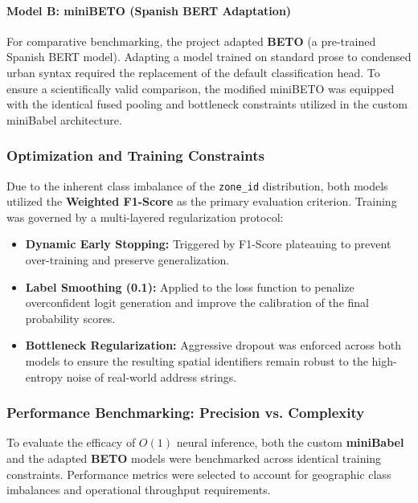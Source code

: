 \paragraph{Model B: miniBETO (Spanish BERT Adaptation)}
For comparative benchmarking, the project adapted \textbf{BETO} (a pre-trained Spanish BERT model). Adapting a model trained on standard prose to condensed urban syntax required the replacement of the default classification head. To ensure a scientifically valid comparison, the modified miniBETO was equipped with the identical fused pooling and bottleneck constraints utilized in the custom miniBabel architecture.

\subsubsection{Optimization and Training Constraints}
Due to the inherent class imbalance of the \texttt{zone\_id} distribution, both models utilized the \textbf{Weighted F1-Score} as the primary evaluation criterion. Training was governed by a multi-layered regularization protocol:
\begin{itemize}[noitemsep, topsep=3pt]
    \item \textbf{Dynamic Early Stopping:} Triggered by F1-Score plateauing to prevent over-training and preserve generalization.
    \item \textbf{Label Smoothing (0.1):} Applied to the loss function to penalize overconfident logit generation and improve the calibration of the final probability scores.
    \item \textbf{Bottleneck Regularization:} Aggressive dropout was enforced across both models to ensure the resulting spatial identifiers remain robust to the high-entropy noise of real-world address strings.
\end{itemize}

\subsubsection{Performance Benchmarking: Precision vs. Complexity}
To evaluate the efficacy of $O(1)$ neural inference, both the custom \textbf{miniBabel} and the adapted \textbf{BETO} models were benchmarked across identical training constraints. Performance metrics were selected to account for geographic class imbalances and operational throughput requirements.

